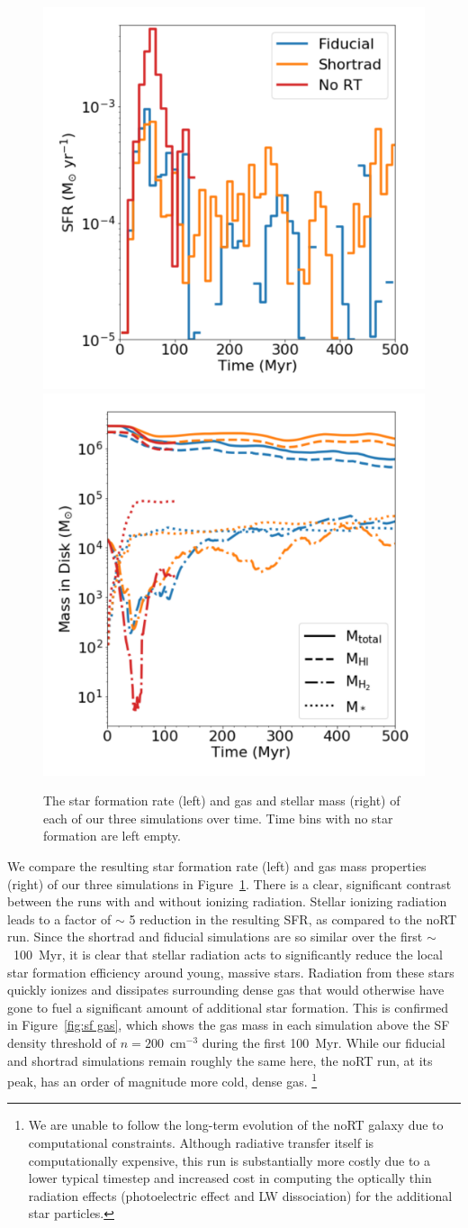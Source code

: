\documentclass[twocolumn]{aastex62}
\begin{document}
\begin{figure}
\centering
\includegraphics[width=0.49\linewidth]{sfr}
\includegraphics[width=0.49\linewidth]{mass}
\caption{The star formation rate (left) and gas and stellar mass (right) of each of our three simulations over time. Time bins with no star formation are left empty.}
\label{fig:sfr_mass_evolution}
\end{figure}

We compare the resulting star formation rate (left) and gas mass properties (right) of our three simulations in Figure~\ref{fig:sfr_mass_evolution}. There is a clear, significant contrast between the runs with and without ionizing radiation. Stellar ionizing radiation leads to a factor of $\sim$ 5 reduction in the resulting SFR, as compared to the noRT run. Since the shortrad and fiducial simulations are so similar over the first $\sim$~100~Myr, it is clear that stellar radiation acts to significantly reduce the local star formation efficiency around young, massive stars. Radiation from these stars quickly ionizes and dissipates surrounding dense gas that would otherwise have gone to fuel a significant amount of additional star formation. This is confirmed in Figure~\ref{fig:sf gas}, which shows the gas mass in each simulation above the SF density threshold of $n = 200$~cm$^{-3}$ during the first 100~Myr. While our fiducial and shortrad simulations remain roughly the same here, the noRT run, at its peak, has an order of magnitude more cold, dense gas. \footnote{We are unable to follow the long-term evolution of the noRT galaxy due to computational constraints. Although radiative transfer itself is computationally expensive, this run is substantially more costly due to a lower typical timestep and increased cost in computing the optically thin radiation effects (photoelectric effect and LW dissociation) for the additional star particles.}
\end{document}
